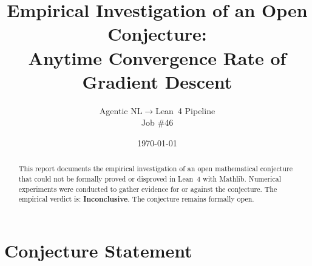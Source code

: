 \documentclass[11pt]{article}
\title{Empirical Investigation of an Open Conjecture:\\
Anytime Convergence Rate of Gradient Descent}
\author{Agentic NL$\to$Lean~4 Pipeline \\ \small Job \#46}
\date{\today}
\begin{document}
\maketitle

\begin{abstract}
This report documents the empirical investigation of an open mathematical conjecture
that could not be formally proved or disproved in Lean~4 with Mathlib.
Numerical experiments were conducted to gather evidence for or against the conjecture.
The empirical verdict is: \textbf{\textcolor{orange!80!black}{Inconclusive}}.
The conjecture remains formally open.
\end{abstract}

\section{Conjecture Statement}
\end{document}
